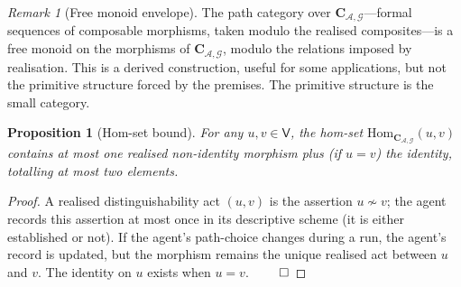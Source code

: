 \documentclass[11pt,twocolumn,a4paper]{article}
\theoremstyle{thmstyle}
\newtheorem{proposition}[theorem]{Proposition}
\theoremstyle{definition}
\theoremstyle{remark}
\newtheorem{remark}[theorem]{Remark}
\newcommand{\Graph}{\mathcal{G}}
\newcommand{\Vrt}{\mathsf{V}}
\newcommand{\Agent}{\mathcal{A}}
\begin{document}
\begin{remark}[Free monoid envelope]
\label{rem:free_monoid}
The path category over $\mathbf{C}_{\Agent,\Graph}$---formal
sequences of composable morphisms, taken modulo the realised
composites---is a free monoid on the morphisms of
$\mathbf{C}_{\Agent,\Graph}$, modulo the relations imposed by
realisation. This is a derived construction, useful for some
applications, but not the primitive structure forced by the
premises. The primitive structure is the small category.
\end{remark}


\begin{proposition}[Hom-set bound]
\label{prop:hom_bound}
For any $u, v \in \Vrt$, the hom-set
$\mathrm{Hom}_{\mathbf{C}_{\Agent,\Graph}}(u, v)$ contains at most
one realised non-identity morphism plus (if $u = v$) the identity,
totalling at most two elements.
\end{proposition}

\begin{proof}
A realised distinguishability act $(u, v)$ is the assertion
$u \not\sim v$; the agent records this assertion at most once in
its descriptive scheme (it is either established or not). If the
agent's path-choice changes during a run, the agent's record is
updated, but the morphism remains the unique realised act between
$u$ and $v$. The identity on $u$ exists when $u = v$. $\qed$
\end{proof}
\end{document}
